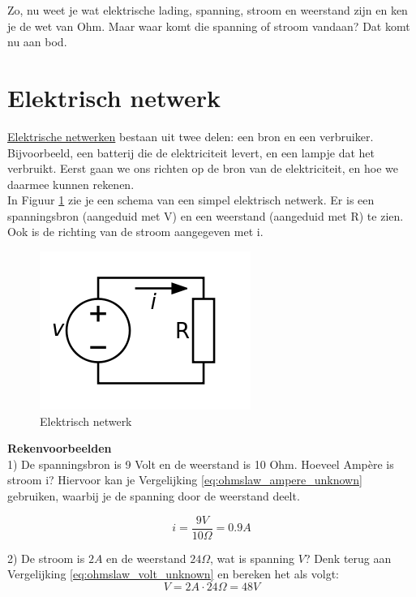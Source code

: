Zo, nu weet je wat elektrische lading, spanning, stroom en weerstand zijn en ken je de wet van Ohm. Maar waar komt die spanning of stroom vandaan? Dat komt nu aan bod.

\section{Elektrisch netwerk}
\href{https://nl.wikipedia.org/wiki/Elektrisch_netwerk}{Elektrische netwerken} bestaan uit twee delen: een bron en een verbruiker. Bijvoorbeeld, een batterij die de elektriciteit levert, en een lampje dat het verbruikt. Eerst gaan we ons richten op de bron van de elektriciteit, en hoe we daarmee kunnen rekenen. \\

In Figuur \ref{fig:elektrischnetwerk} zie je een schema van een simpel elektrisch netwerk. Er is een spanningsbron (aangeduid met V) en een weerstand (aangeduid met R) te zien. Ook is de richting van de stroom aangegeven met i.
\begin{figure}[h!]
	\includegraphics[scale=0.5]{./img/elektrisch_netwerk.png}
	\centering
	\caption{Elektrisch netwerk}
	\label{fig:elektrischnetwerk}
\end{figure}

\textbf{Rekenvoorbeelden} \\
1) De spanningsbron is 9 Volt en de weerstand is 10 Ohm. Hoeveel Ampère is stroom i? 
Hiervoor kan je Vergelijking \ref{eq:ohmslaw_ampere_unknown} gebruiken, waarbij je de spanning door de weerstand deelt. 

\begin{equation}
	i = \frac{9V}{10\Omega} = 0.9A
\end{equation}

2) De stroom is $2A$ en de weerstand $24 \Omega$, wat is spanning $V$? Denk terug aan Vergelijking \ref{eq:ohmslaw_volt_unknown} en bereken het als volgt:
\begin{equation}
	V = 2A \cdot 24 \Omega = 48V
\end{equation}

